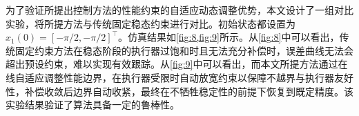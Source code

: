 \documentclass[pdflatex,sn-mathphys-num]{sn-jnl}%
\theoremstyle{thmstyleone}%
\theoremstyle{thmstyletwo}%
\theoremstyle{thmstylethree}%
\begin{document}


为了验证所提出控制方法的性能约束的自适应动态调整优势，本文设计了一组对比实验，将所提方法与传统固定稳态约束进行对比。初始状态都设置为 $x_1(0) = [-\pi/2, -\pi/2]^{\top}$。仿真结果如\cref{fig:8,fig:9}所示。从\cref{fig:8}中可以看出，传统固定约束方法在稳态阶段的执行器过饱和时且无法充分补偿时，误差曲线无法会超出预设约束，难以实现有效跟踪。从\cref{fig:9}中可以看出，而本文所提方法通过在线自适应调整性能边界，在执行器受限时自动放宽约束以保障不越界与执行器友好性，补偿收敛后边界自动收紧，最终在不牺牲稳定性的前提下恢复到既定精度。该实验结果验证了算法具备一定的鲁棒性。


\end{document}
